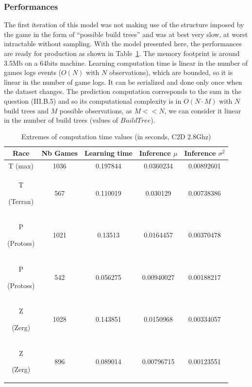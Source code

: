\subsubsection{Performances}
The first iteration of this model was not making use of the structure imposed by the game in the form of ``possible build trees'' and was at best very slow, at worst intractable without sampling. With the model presented here, the performances are ready for production as shown in Table~\ref{CPU}. The memory footprint is around 3.5Mb on a 64bits machine. Learning computation time is linear in the number of games logs events ($O(N)$ with $N$ observations), which are bounded, so it is linear in the number of game logs. It can be serialized and done only once when the dataset changes. The prediction computation corresponds to the sum in the question (III.B.5) and so its computational complexity is in $O(N\cdot M)$ with $N$ build trees and $M$ possible observations, as $M << N$, we can consider it linear in the number of build trees (values of $BuildTree$).

\begin{table}[h]
\caption{Extremes of computation time values (in seconds, C2D 2.8Ghz)}
\begin{center}
\begin{tabular}{|c|cc|cc|}
\hline
Race
& Nb Games
& Learning time
& Inference $\mu$
& Inference $\sigma^2$ \\ \hline
T (max) & 1036 & 0.197844 & 0.0360234 & 0.00892601 \\
T \begin{tiny}(Terran)\end{tiny} & 567 & 0.110019 & 0.030129 & 0.00738386 \\ 
P \begin{tiny}(Protoss)\end{tiny} & 1021 & 0.13513 & 0.0164457 & 0.00370478 \\
P \begin{tiny}(Protoss)\end{tiny} & 542 & 0.056275 & 0.00940027 & 0.00188217 \\ 
Z \begin{tiny}(Zerg)\end{tiny} & 1028 & 0.143851 & 0.0150968 & 0.00334057 \\
Z \begin{tiny}(Zerg)\end{tiny} & 896 & 0.089014 & 0.00796715 & 0.00123551 \\ \hline
\end{tabular}
\label{CPU}
\end{center}
\end{table}

